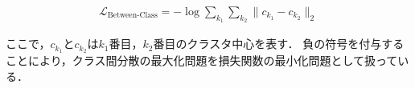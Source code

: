 \documentclass[a4paper,11pt,nomag]{jsreport}
\begin{document}
\begin{align}
  \mathcal{L}_{\text{Between-Class}} = -\log{\sum_{k_1} {\sum_{k_2} {\lVert c_{k_1} - c_{k_2} \rVert_2}}}
\end{align}

\noindent
ここで，$c_{k_1}$と$c_{k_2}$は$k_1$番目，$k_2$番目のクラスタ中心を表す．
負の符号を付与することにより，クラス間分散の最大化問題を損失関数の最小化問題として扱っている．



\end{document}
